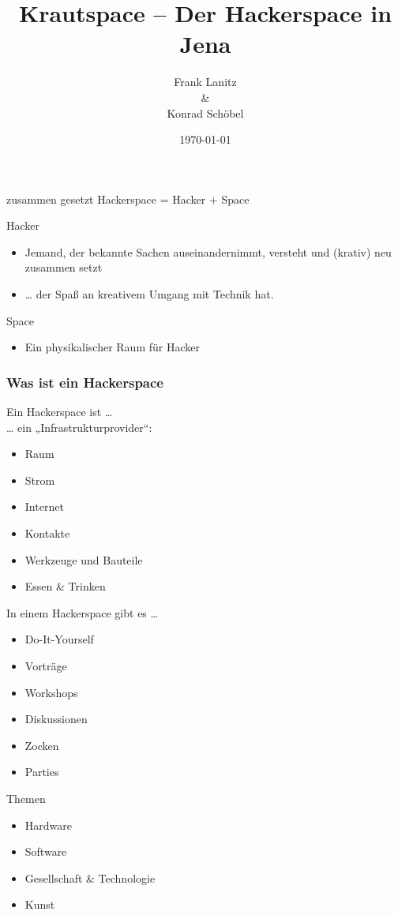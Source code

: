 \documentclass[]{beamer}
\title{Krautspace -- Der Hackerspace in Jena}
\author{Frank Lanitz \\ \& \\Konrad Schöbel}
\date{\today}
\begin{document}
\frame{\titlepage}
\begin{frame}
	\begin{block}{zusammen gesetzt}
		\centering{}
		Hackerspace = Hacker + Space
	\end{block}
	\pause{}
	\begin{block}{Hacker}
		\begin{itemize}
			\item Jemand, der bekannte Sachen auseinandernimmt, versteht 
				und (krativ) neu zusammen setzt
			\item \dots{} der Spaß an kreativem Umgang mit Technik hat.
		\end{itemize}
	\end{block}
	\pause{}
	\begin{block}{Space}
		\begin{itemize}
			\item Ein physikalischer Raum für Hacker
		\end{itemize}
	\end{block}
\end{frame}
\begin{frame}
	\frametitle{Was ist ein Hackerspace}
	\begin{block}{}
		Ein Hackerspace ist \dots{} \\	
		\dots{} ein „Infrastrukturprovider“:
		\begin{itemize}
			\item Raum
			\item Strom
			\item Internet
			\item Kontakte
			\item Werkzeuge und Bauteile
			\item Essen \& Trinken	
		\end{itemize}
	\end{block}
\end{frame}
\begin{frame}
	\begin{block}{In einem Hackerspace gibt es \dots{}}
	\begin{itemize}
			\item Do-It-Yourself
			\item Vorträge
			\item Workshops
			\item Diskussionen
			\item Zocken
			\item Parties
		\end{itemize}
	\end{block}
	\begin{block}{Themen}
		\begin{itemize}
			\item Hardware
			\item Software
			\item Gesellschaft \& Technologie
			\item Kunst
		\end{itemize}
	\end{block}
\end{frame}
\end{document}
